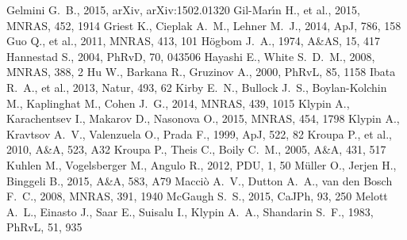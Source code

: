 \documentclass[a4wide,12pt]{book}
\begin{document}
{\begin{thebibliography}{}
Gelmini G.~B., 2015, arXiv, arXiv:1502.01320
 Gil-Mar{\'{\i}}n H., et al., 2015, MNRAS, 
452, 1914  
 Griest K., Cieplak A.~M., Lehner M.~J., 2014, ApJ, 786, 158
Guo Q., et al., 2011, MNRAS, 413, 101 
 H{\"o}gbom J.~A., 1974, A\&AS, 15, 417  
Hannestad S., 2004, PhRvD, 70, 043506 
 Hayashi E., White S.~D.~M., 2008, MNRAS, 388, 2 
 Hu W., Barkana R., Gruzinov A., 2000, PhRvL, 85, 1158 
Ibata R.~A., et al., 2013, Natur, 493, 62
Kirby E.~N., Bullock J.~S., Boylan-Kolchin M., Kaplinghat M., Cohen J.~G., 
2014, MNRAS, 439, 1015  
Klypin A., Karachentsev I., Makarov D., Nasonova O., 2015, MNRAS, 454, 1798 
Klypin A., Kravtsov A.~V., Valenzuela O., Prada F., 1999, ApJ, 522, 82 
 Kroupa P., et al., 2010, A\&A, 523, A32 
 Kroupa P., Theis C., Boily C.~M., 2005, A\&A, 431, 517 
 Kuhlen M., Vogelsberger M., Angulo R., 2012, PDU, 1, 50 
 M{\"u}ller O., Jerjen H., Binggeli B., 2015, A\&A, 583, A79 
 Macci{\`o} A.~V., Dutton A.~A., van den Bosch F.~C., 2008, MNRAS, 391, 1940 
McGaugh S.~S., 2015, CaJPh, 93, 250 
Melott A.~L., Einasto J., Saar E., Suisalu I., Klypin A.~A., Shandarin 
S.~F., 1983, PhRvL, 51, 935 

\end{thebibliography}}
\end{document}
